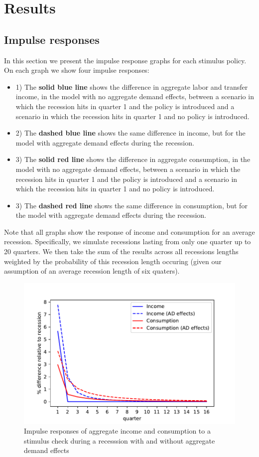 \documentclass[../HAFiscal]{subfiles}
\begin{document}
\FloatBarrier
\section{Results}


\subsection{Impulse responses}
In this section we present the impulse response graphs for each stimulus policy. On each graph we show four impulse responses:
\begin{itemize}
	\item 1) The \textbf{solid blue line} shows the difference in aggregate labor and transfer income, in the model with no aggregate demand effects, between a scenario in which the recession hits in quarter 1 and the policy is introduced and a scenario in which the recession hits in quarter 1 and no policy is introduced.
	\item 2) The \textbf{dashed blue line} shows the same difference in income, but for the model with aggregate demand effects during the recession.
	\item 3) The \textbf{solid red line} shows the difference in aggregate consumption, in the model with no aggregate demand effects, between a scenario in which the recession hits in quarter 1 and the policy is introduced and a scenario in which the recession hits in quarter 1 and no policy is introduced.
	\item 3) The \textbf{dashed red line} shows the same difference in consumption, but for the model with aggregate demand effects during the recession.
\end{itemize}

Note that all graphs show the response of income and consumption for an average recession. Specifically, we simulate recessions lasting from only one quarter up to 20 quarters. We then take the sum of the results across all recessions lengths weighted by the probability of this recession length occuring (given our assumption of an average recession length of six quaters).

\begin{figure}
	\centering
	\includegraphics[width=0.8\linewidth]{Code/HA-Models/FromPandemicCode/Figures/recession_Check_relrecession}
	\caption{Impulse responses of aggregate income and consumption to a stimulus check during a recesssion with and without aggregate demand effects}
	\label{fig:recessioncheckrelrecession}
\end{figure}
\end{document}
